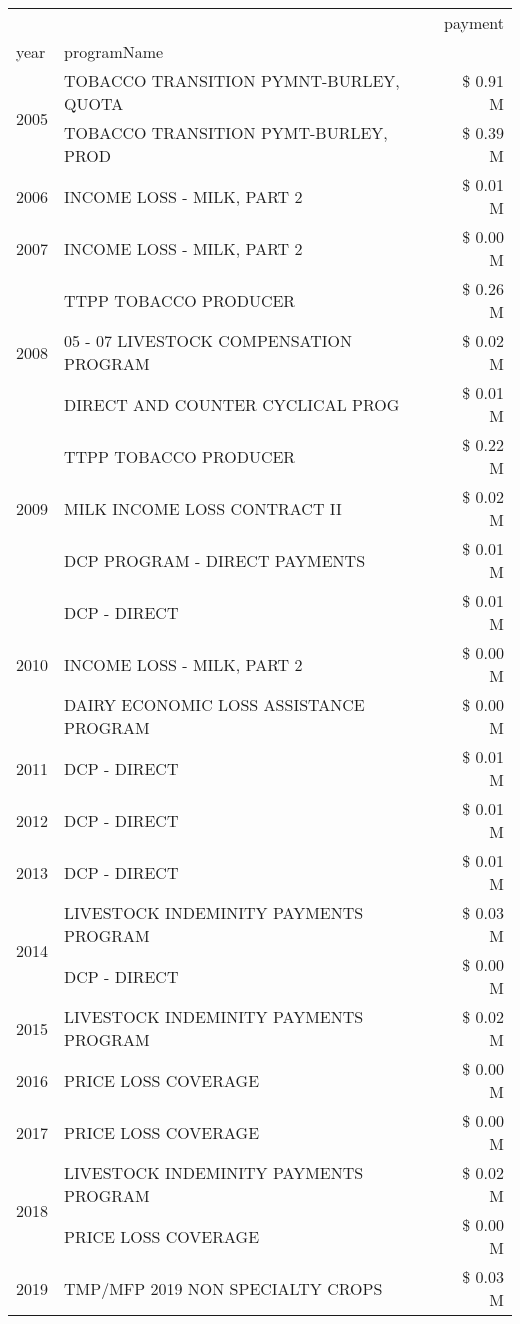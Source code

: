 \begin{tabular}{llr}
\toprule
 &  & payment \\
year & programName &  \\
\midrule
\multirow[t]{2}{*}{2005} & TOBACCO TRANSITION PYMNT-BURLEY, QUOTA & \$ 0.91 M \\
 & TOBACCO TRANSITION PYMT-BURLEY, PROD & \$ 0.39 M \\
\cline{1-3}
2006 & INCOME LOSS - MILK, PART 2 & \$ 0.01 M \\
\cline{1-3}
2007 & INCOME LOSS - MILK, PART 2 & \$ 0.00 M \\
\cline{1-3}
\multirow[t]{3}{*}{2008} & TTPP TOBACCO PRODUCER & \$ 0.26 M \\
 & 05 - 07 LIVESTOCK COMPENSATION PROGRAM & \$ 0.02 M \\
 & DIRECT AND COUNTER CYCLICAL PROG & \$ 0.01 M \\
\cline{1-3}
\multirow[t]{3}{*}{2009} & TTPP TOBACCO PRODUCER & \$ 0.22 M \\
 & MILK INCOME LOSS CONTRACT II & \$ 0.02 M \\
 & DCP PROGRAM - DIRECT PAYMENTS & \$ 0.01 M \\
\cline{1-3}
\multirow[t]{3}{*}{2010} & DCP - DIRECT & \$ 0.01 M \\
 & INCOME LOSS - MILK, PART 2 & \$ 0.00 M \\
 & DAIRY ECONOMIC LOSS ASSISTANCE PROGRAM & \$ 0.00 M \\
\cline{1-3}
2011 & DCP - DIRECT & \$ 0.01 M \\
\cline{1-3}
2012 & DCP - DIRECT & \$ 0.01 M \\
\cline{1-3}
2013 & DCP - DIRECT & \$ 0.01 M \\
\cline{1-3}
\multirow[t]{2}{*}{2014} & LIVESTOCK INDEMINITY PAYMENTS PROGRAM & \$ 0.03 M \\
 & DCP - DIRECT & \$ 0.00 M \\
\cline{1-3}
2015 & LIVESTOCK INDEMINITY PAYMENTS PROGRAM & \$ 0.02 M \\
\cline{1-3}
2016 & PRICE LOSS COVERAGE & \$ 0.00 M \\
\cline{1-3}
2017 & PRICE LOSS COVERAGE & \$ 0.00 M \\
\cline{1-3}
\multirow[t]{2}{*}{2018} & LIVESTOCK INDEMINITY PAYMENTS PROGRAM & \$ 0.02 M \\
 & PRICE LOSS COVERAGE & \$ 0.00 M \\
\cline{1-3}
\multirow[t]{3}{*}{2019} & TMP/MFP 2019 NON SPECIALTY CROPS & \$ 0.03 M \\

\end{tabular}
